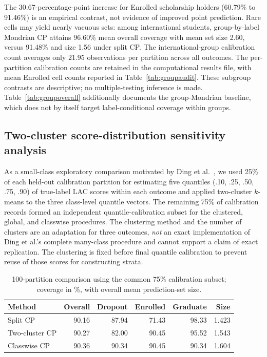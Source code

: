The 30.67-percentage-point increase for \textsf{Enrolled} scholarship holders
(60.79\% to 91.46\%) is an empirical contrast, not evidence of improved
point prediction. Rare cells may yield nearly vacuous sets: among international
students, group-by-label Mondrian CP attains 96.60\% mean overall coverage
with mean set size 2.60, versus 91.48\% and size 1.56 under split CP.
The international-group calibration count averages only 21.95 observations
per partition across all outcomes. The per-partition calibration counts are retained in the computational
results file, with mean \textsf{Enrolled} cell counts reported in Table~\ref{tab:groupaudit}.
These subgroup contrasts are descriptive; no multiple-testing inference is made.
Table~\ref{tab:groupoverall} additionally documents the group-Mondrian
baseline, which does not by itself target label-conditional coverage within groups.

\subsection{Two-cluster score-distribution sensitivity analysis}\label{sec:cluster}

As a small-class exploratory comparison motivated by
Ding et al.~\cite{ding2023}, we used 25\% of each held-out calibration
partition for estimating five quantiles (.10, .25, .50, .75, .90) of true-label
LAC scores within each outcome and applied two-cluster $k$-means to the three
class-level quantile vectors. The remaining 75\% of calibration records formed
an independent quantile-calibration subset for the clustered, global, and
classwise procedures. The clustering method and the number of clusters are
an adaptation for three outcomes, \emph{not} an exact implementation of
Ding et al.'s complete many-class procedure and cannot support a claim of exact replication. The clustering is fixed before final
quantile calibration to prevent reuse of those scores for constructing strata.

\begin{table}[htbp]
\centering\small
\caption{100-partition comparison using the common 75\% calibration subset;
coverage in \%, with overall mean prediction-set size.}
\label{tab:cluster}
\begin{tabular}{lrrrrr}
\toprule Method & Overall & Dropout & Enrolled & Graduate & Size\\
\midrule
Split CP & 90.16 & 87.94 & 71.43 & 98.33 & 1.423\\
Two-cluster CP & 90.27 & 82.00 & 90.45 & 95.52 & 1.543\\
Classwise CP & 90.36 & 90.34 & 90.45 & 90.34 & 1.604\\
\bottomrule
\end{tabular}
\end{table}

